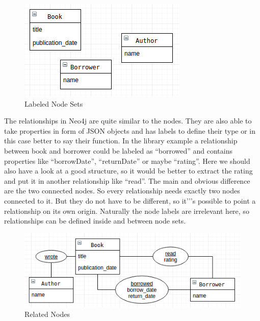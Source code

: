 \begin{figure}[H]
	\includegraphics[width=\linewidth,keepaspectratio]{images/neo4j/data-structure/labeled-nodes.png}
	\caption{Labeled Node Sets}
\end{figure}

The relationships in Neo4j are quite similar to the nodes. They are also able to take properties in form of JSON objects and has labels to define their type or in this case better to say their function. In the library example a relationship between book and borrower could be labeled as “borrowed” and contains properties like “borrowDate”, “returnDate” or maybe “rating”. Here we should also have a look at a good structure, so it would be better to extract the rating and put it in another relationship like “read”.
The main and obvious difference are the two connected nodes. So every relationship needs exactly two nodes connected to it. But they do not have to be different, so it'’'s possible to point a relationship on its own origin. Naturally the node labels are irrelevant here, so relationships can be defined inside and between node sets.
\cite["Relationships", para. 1]{NeoTechnology2017c.2017c} \cite[p. 81-82]{Gupta.2015} \cite[slide 22-25]{Hunger.2013}

\begin{figure}[H]
	\includegraphics[width=\linewidth,keepaspectratio]{images/neo4j/data-structure/node-relationships.png}
	\caption{Related Nodes}
\end{figure}

